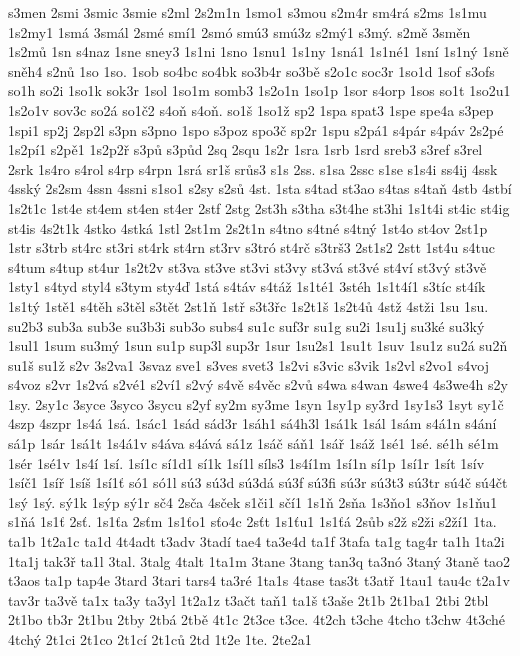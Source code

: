 {s3men
2smi
3smic
3smie
s2ml
2s2m1n
1smo1
s3mou
s2m4r
sm4rá
s2ms
1s1mu
1s2my1
1smá
3smál
2smé
smí1
2smó
smú3
smú3z
s2mý1
s3mý.
s2mě
3směn
1s2mů
1sn
s4naz
1sne
sney3
1s1ni
1sno
1snu1
1s1ny
1sná1
1s1né1
1sní
1s1ný
1sně
sněh4
s2nů
1so
1so.
1sob
so4bc
so4bk
so3b4r
so3bě
s2o1c
soc3r
1so1d
1sof
s3ofs
so1h
so2i
1so1k
sok3r
1sol
1so1m
somb3
1s2o1n
1so1p
1sor
s4orp
1sos
so1t
1so2u1
1s2o1v
sov3c
so2á
so1č2
s4oň
s4oň.
so1š
1so1ž
sp2
1spa
spat3
1spe
spe4a
s3pep
1spi1
sp2j
2sp2l
s3pn
s3pno
1spo
s3poz
spo3č
sp2r
1spu
s2pá1
s4pár
s4páv
2s2pé
1s2pí1
s2pě1
1s2p2ř
s3pů
s3půd
2sq
2squ
1s2r
1sra
1srb
1srd
sreb3
s3ref
s3rel
2srk
1s4ro
s4rol
s4rp
s4rpn
1srá
sr1š
srůs3
s1s
2ss.
s1sa
2ssc
s1se
s1s4i
ss4ij
4ssk
4sský
2s2sm
4ssn
4ssni
s1so1
s2sy
s2sů
4st.
1sta
s4tad
st3ao
s4tas
s4taň
4stb
4stbí
1s2t1c
1st4e
st4em
st4en
st4er
2stf
2stg
2st3h
s3tha
s3t4he
st3hi
1s1t4i
st4ic
st4ig
st4is
4s2t1k
4stko
4stká
1stl
2st1m
2s2t1n
s4tno
s4tné
s4tný
1st4o
st4ov
2st1p
1str
s3trb
st4rc
st3ri
st4rk
st4rn
st3rv
s3tró
st4rč
s3trš3
2st1s2
2stt
1st4u
s4tuc
s4tum
s4tup
st4ur
1s2t2v
st3va
st3ve
st3vi
st3vy
st3vá
st3vé
st4ví
st3vý
st3vě
1sty1
s4tyd
styl4
s3tym
sty4ď
1stá
s4táv
s4táž
1s1té1
3stéh
1s1t4í1
s3tíc
st4ík
1s1tý
1stě1
s4těh
s3těl
s3tět
2st1ň
1stř
s3t3řc
1s2t1š
1s2t4ů
4stž
4stži
1su
1su.
su2b3
sub3a
sub3e
su3b3i
sub3o
subs4
su1c
suf3r
su1g
su2i
1su1j
su3ké
su3ký
1sul1
1sum
su3mý
1sun
su1p
sup3l
sup3r
1sur
1su2s1
1su1t
1suv
1su1z
su2á
su2ň
su1š
su1ž
s2v
3s2va1
3svaz
sve1
s3ves
svet3
1s2vi
s3vic
s3vik
1s2vl
s2vo1
s4voj
s4voz
s2vr
1s2vá
s2vé1
s2ví1
s2vý
s4vě
s4věc
s2vů
s4wa
s4wan
4swe4
4s3we4h
s2y
1sy.
2sy1c
3syce
3syco
3sycu
s2yf
sy2m
sy3me
1syn
1sy1p
sy3rd
1sy1s3
1syt
sy1č
4szp
4szpr
1s4á
1sá.
1sác1
1sád
sád3r
1sáh1
sá4h3l
1sá1k
1sál
1sám
s4á1n
s4ání
sá1p
1sár
1sá1t
1s4á1v
s4áva
s4ává
sá1z
1sáč
sáň1
1sář
1sáž
1sé1
1sé.
sé1h
sé1m
1sér
1sé1v
1s4í
1sí.
1sí1c
sí1d1
sí1k
1sí1l
síls3
1s4í1m
1sí1n
sí1p
1sí1r
1sít
1sív
1síč1
1síř
1síš
1sí1ť
só1
só1l
sú3
sú3d
sú3dá
sú3f
sú3fi
sú3r
sú3t3
sú3tr
sú4č
sú4čt
1sý
1sý.
sý1k
1sýp
sý1r
sč4
2sča
4sček
s1či1
sčí1
1s1ň
2sňa
1s3ňo1
s3ňov
1s1ňu1
s1ňá
1s1ť
2sť.
1s1ťa
2sťm
1s1ťo1
sťo4c
2sťt
1s1ťu1
1s1ťá
2sůb
s2ž
s2ži
s2ží1
1ta.
ta1b
1t2a1c
ta1d
4t4adt
t3adv
3tadí
tae4
ta3e4d
ta1f
3tafa
ta1g
tag4r
ta1h
1ta2i
1ta1j
tak3ř
ta1l
3tal.
3talg
4talt
1ta1m
3tane
3tang
tan3q
ta3nó
3taný
3taně
tao2
t3aos
ta1p
tap4e
3tard
3tari
tars4
ta3ré
1ta1s
4tase
tas3t
t3atř
1tau1
tau4c
t2a1v
tav3r
ta3vě
ta1x
ta3y
ta3yl
1t2a1z
t3ačt
taň1
ta1š
t3aše
2t1b
2t1ba1
2tbi
2tbl
2t1bo
tb3r
2t1bu
2tby
2tbá
2tbě
4t1c
2t3ce
t3ce.
4t2ch
t3che
4tcho
t3chw
4t3ché
4tchý
2t1ci
2t1co
2t1cí
2t1ců
2td
1t2e
1te.
2te2a1
}
